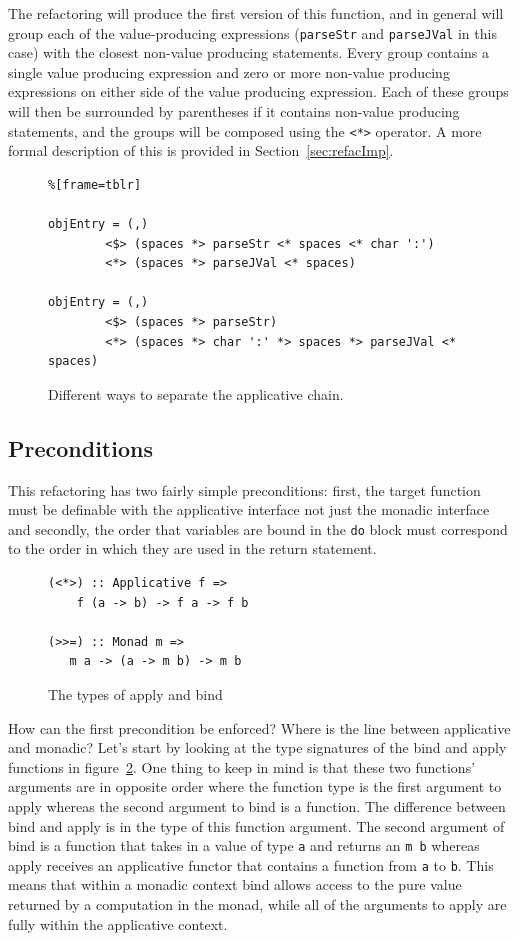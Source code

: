 The refactoring will produce the first version of this function, and in general will group each of the value-producing expressions (\texttt{parseStr} and \texttt{parseJVal} in this case) with the closest non-value producing statements. Every group contains a single value producing expression and zero or more non-value producing expressions on either side of the value producing expression. Each of these groups will then be surrounded by parentheses if it contains non-value producing statements, and the groups will be composed using the \texttt{<*>} operator. A more formal description of this is provided in Section~\ref{sec:refacImp}.


\begin{figure}[t]
\begin{lstlisting}%[frame=tblr]

objEntry = (,) 
        <$> (spaces *> parseStr <* spaces <* char ':') 
        <*> (spaces *> parseJVal <* spaces)

objEntry = (,) 
        <$> (spaces *> parseStr) 
        <*> (spaces *> char ':' *> spaces *> parseJVal <* spaces)
\end{lstlisting}
\caption{Different ways to separate the applicative chain.}
\label{objEntry2}
\end{figure}

\subsection{Preconditions}
\label{sec:appPrecons}

This refactoring has two fairly simple preconditions: first, the target function must be definable with the applicative interface not just the monadic interface and secondly, the order that variables are bound in the \texttt{do} block must correspond to the order in which they are used in the return statement. 

\begin{figure}[t]
\begin{lstlisting}
(<*>) :: Applicative f => 
	f (a -> b) -> f a -> f b

(>>=) :: Monad m => 
   m a -> (a -> m b) -> m b
\end{lstlisting}
\caption{The types of apply and bind}
\label{appBind}
\end{figure} 

How can the first precondition be enforced? Where is the line between applicative and monadic? Let's start by looking at the type signatures of the bind and apply functions in figure~\ref{appBind}. One thing to keep in mind is that these two functions' arguments are in opposite order where the function type is the first argument to apply whereas the second argument to bind is a function. The difference between bind and apply is in the type of this function argument. The second argument of bind is a function that takes in a value of type \texttt{a} and returns an \texttt{m b} whereas apply receives an applicative functor that contains a function from \texttt{a} to \texttt{b}. This means that within a monadic context bind allows access to the pure value returned by a computation in the monad, while all of the arguments to apply are fully within the applicative context.

